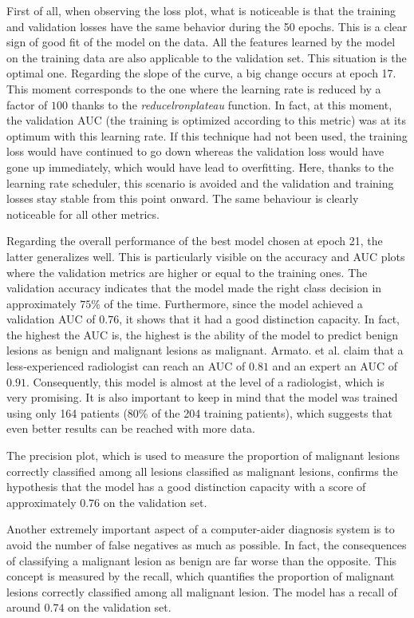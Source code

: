 First of all, when observing the loss plot, what is noticeable is that the training and validation losses have the same behavior during the 50 epochs. This is a clear sign of good fit of the model on the data. All the features learned by the model on the training data are also applicable to the validation set. This situation is the optimal one. Regarding the slope of the curve, a big change occurs at epoch 17. This moment corresponds to the one where the learning rate is reduced by a factor of $100$ thanks to the \textit{reducelronplateau} function. In fact, at this moment, the validation AUC (the training is optimized according to this metric) was at its optimum with this learning rate. If this technique had not been used, the training loss would have continued to go down whereas the validation loss would have gone up immediately, which would have lead to overfitting. Here, thanks to the learning rate scheduler, this scenario is avoided and the validation and training losses stay stable from this point onward. The same behaviour is clearly noticeable for all other metrics.

Regarding the overall performance of the best model chosen at epoch 21, the latter generalizes well. This is particularly visible on the accuracy and AUC plots where the validation metrics are higher or equal to the training ones. The validation accuracy indicates that the model made the right class decision in approximately $75$\% of the time. Furthermore, since the model achieved a validation AUC of $0.76$, it shows that it had a good distinction capacity. In fact, the highest the AUC is, the highest is the ability of the model to predict benign lesions as benign and malignant lesions as malignant. Armato. et al. \cite{42} claim that a less-experienced radiologist can reach an AUC of $0.81$ and an expert an AUC of $0.91$. Consequently, this model is almost at the level of a radiologist, which is very promising. It is also important to keep in mind that the model was trained using only 164 patients (80\% of the 204 training patients), which suggests that even better results can be reached with more data.

The precision plot, which is used to measure the proportion of malignant lesions correctly classified among all lesions classified as malignant lesions, confirms the hypothesis that the model has a good distinction capacity with a score of approximately $0.76$ on the validation set.

Another extremely important aspect of a computer-aider diagnosis system is to avoid the number of false negatives as much as possible. In fact, the consequences of classifying a malignant lesion as benign are far worse than the opposite. This concept is measured by the recall, which quantifies the proportion of malignant lesions correctly classified among all malignant lesion. The model has a recall of around $0.74$ on the validation set.

